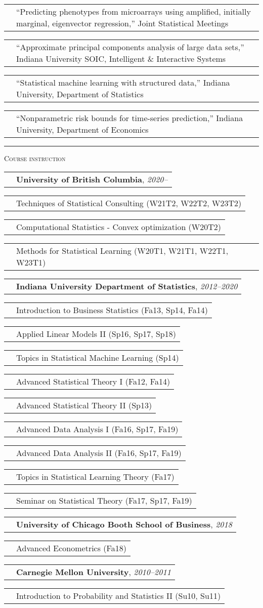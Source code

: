 \documentclass[11pt,letterpaper]{minimal/moderncv}
\makeatletter
\renewcommand{\section}[1]{  \par\addvspace{15pt}%
  \parbox[t]{\hintscolumnwidth}{\strut\raggedleft\raisebox{4pt}%
  {\rule{\hintscolumnwidth}{2pt}}}%
  \hspace{\separatorcolumnwidth}%
  \textsc{\Large #1}\par\nobreak\addvspace{6pt}%
}
\renewcommand*{\cvitem}[2]{%
  \begin{tabular}{@{}p{\hintscolumnwidth}@{\hspace{\separatorcolumnwidth}}%
    p{\maincolumnwidth}@{}}%
    \raggedleft {#1} &  {#2}%
  \end{tabular}%
}
\makeatother
\begin{document}
\cvitem{}{ ``Predicting phenotypes from microarrays using amplified,
  initially marginal, eigenvector regression,'' Joint Statistical Meetings}

\cvitem{2015}{ ``Approximate principal components analysis of large data sets,''
  Indiana University SOIC, Intelligent \& Interactive Systems}

\cvitem{2014}{ ``Statistical machine learning with structured data,''
  Indiana University, Department of Statistics}

\cvitem{2012}{ ``Nonparametric risk bounds for time-series prediction,''
  Indiana University, Department of Economics}





\section{Course instruction}

\vspace{6pt}
\cvitem{}{\textbf{University of British Columbia}, \emph{2020--}}
\cvitem{Stat 550}{Techniques of Statistical Consulting (W21T2, W22T2, W23T2)}
\cvitem{Stat 535a}{Computational Statistics - Convex optimization (W20T2)}
\cvitem{Stat 406}{Methods for Statistical Learning (W20T1, W21T1, W22T1, W23T1)}

\vspace{6pt}
\cvitem{}{\textbf{Indiana University Department of Statistics},
  \emph{2012--2020}}
\cvitem{S301}{Introduction to Business Statistics (Fa13, Sp14, Fa14)}
\cvitem{S432}{Applied Linear Models II (Sp16, Sp17, Sp18)}
\cvitem{S682}{Topics in Statistical Machine Learning (Sp14)}
\cvitem{S721}{Advanced Statistical Theory I (Fa12, Fa14)}
\cvitem{S722}{Advanced Statistical Theory II (Sp13)}
\cvitem{S771}{Advanced Data Analysis I (Fa16, Sp17, Fa19)}
\cvitem{S772}{Advanced Data Analysis II (Fa16, Sp17, Fa19)}
\cvitem{S782}{Topics in Statistical Learning Theory (Fa17)}
\cvitem{S785}{Seminar on Statistical Theory (Fa17, Sp17, Fa19)}

\vspace{6pt}
\cvitem{}{\textbf{University of Chicago Booth School of Business},
  \emph{2018}}
\cvitem{41911}{Advanced Econometrics (Fa18)}

\vspace{6pt}
\cvitem{}{\textbf{Carnegie Mellon University}, \emph{2010--2011}}
\cvitem{36--226}{Introduction to Probability and Statistics II (Su10,
  Su11)}
\end{document}
